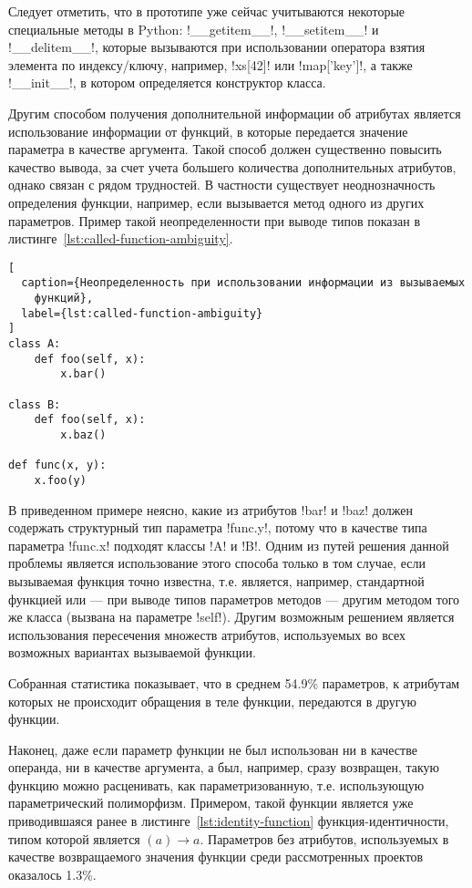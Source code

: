Следует отметить, что в прототипе уже сейчас учитываются некоторые специальные
методы в Python: !__getitem__!, !__setitem__! и !__delitem__!,
которые вызываются при использовании оператора взятия элемента по индексу/ключу,
например, !xs[42]! или !map['key']!, а также !__init__!, в котором определяется
конструктор класса.

Другим способом получения дополнительной информации об атрибутах является
использование информации от функций, в которые передается значение параметра в
качестве аргумента. Такой способ должен существенно повысить качество вывода, за
счет учета большего количества дополнительных атрибутов, однако связан с рядом
трудностей. В частности существует неоднозначность определения функции,
например, если вызывается метод одного из других параметров. Пример такой
неопределенности при выводе типов показан в
листинге~\ref{lst:called-function-ambiguity}.

\begin{lstlisting}[
  caption={Неопределенность при использовании информации из вызываемых
    функций},
  label={lst:called-function-ambiguity}
]
class A:
    def foo(self, x):
        x.bar()

class B:
    def foo(self, x):
        x.baz()

def func(x, y):
    x.foo(y)
\end{lstlisting}

В приведенном примере неясно, какие из атрибутов !bar! и !baz! должен содержать
структурный тип параметра !func.y!, потому что в качестве типа параметра
!func.x! подходят классы !A! и !B!. Одним из путей решения данной проблемы
является использование этого способа только в том случае, если вызываемая функция точно
известна, т.е. является, например, стандартной функцией или --- при выводе
типов параметров методов --- другим методом того же класса (вызвана на параметре
!self!). Другим возможным решением является использования пересечения множеств
атрибутов, используемых во всех возможных вариантах вызываемой функции.

Собранная статистика показывает, что в среднем 54.9\% параметров, к атрибутам
которых не происходит обращения в теле функции, передаются в другую функции.

Наконец, даже если параметр функции не был использован ни в качестве операнда,
ни в качестве аргумента, а был, например, сразу возвращен, такую функцию можно
расценивать, как параметризованную, т.е. использующую параметрический
полиморфизм. Примером, такой функции является уже приводившаяся ранее в
листинге~\ref{lst:identity-function} функция-идентичности, типом которой
является $(a) \rightarrow a$. Параметров без атрибутов, используемых в качестве
возвращаемого значения функции среди рассмотренных проектов оказалось 1.3\%.

